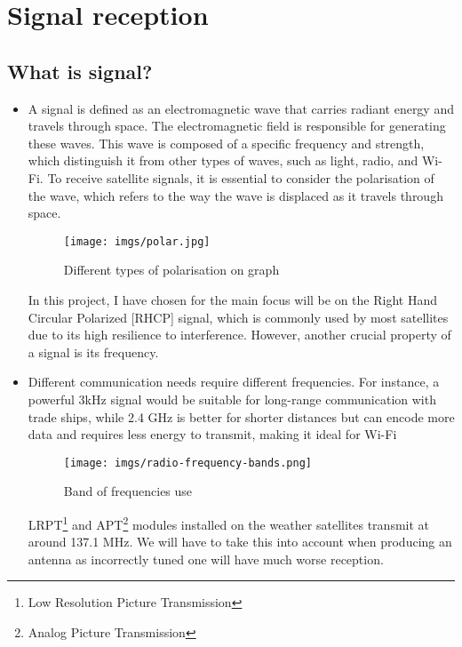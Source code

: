 \documentclass{article}
\begin{document}
\section{Signal reception}
    \subsection{What is signal?}
        \begin{itemize}
            \item[] A signal is defined as an electromagnetic wave that carries radiant energy and travels through space\cite{6}. The electromagnetic field is responsible for generating these waves. This wave is composed of a specific frequency and strength, which distinguish it from other types of waves, such as light, radio, and Wi-Fi. To receive satellite signals, it is essential to consider the polarisation of the wave, which refers to the way the wave is displaced as it travels through space.

            \begin{figure}[H]
                \centering
                \texttt{[image: imgs/polar.jpg]}
                \caption{Different types of polarisation on graph \cite{6}}
            \end{figure}
            
            In this project, I have chosen for the main focus will be on the Right Hand Circular Polarized [RHCP] signal, which is commonly used by most satellites due to its high resilience to interference. However, another crucial property of a signal is its frequency. 

            \item[] Different communication needs require different frequencies. For instance, a powerful 3kHz signal would be suitable for long-range communication with trade ships, while 2.4 GHz is better for shorter distances but can encode more data and requires less energy to transmit, making it ideal for Wi-Fi
            
            \begin{figure}[H]
                \centering
                \texttt{[image: imgs/radio-frequency-bands.png]}
                \caption{Band of frequencies use \cite{11}}
                \label{freq band image}
            \end{figure}
            
            LRPT\footnote{Low Resolution Picture Transmission} and APT\footnote{Analog Picture Transmission} modules installed on the weather satellites transmit at around 137.1 MHz. We will have to take this into account when producing an antenna as incorrectly tuned one will have much worse reception.


\end{itemize}
\end{document}
